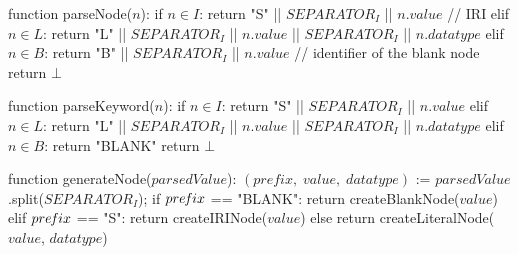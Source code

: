 function parseNode($n$):
    if $n \in I$:            
        return "S" || $SEPARATOR_{I}$ || $n.value$  // IRI
    elif $n \in L$:
        return "L" || $SEPARATOR_{I}$ || $n.value$ || $SEPARATOR_{I}$ || $n.datatype$
    elif $n \in B$:
        return "B" || $SEPARATOR_{I}$ || $n.value$    // identifier of the blank node
    return $\bot$

function parseKeyword($n$):
    if $n \in I$:            
        return "S" || $SEPARATOR_{I}$ || $n.value$   
    elif $n \in L$:
        return "L" || $SEPARATOR_{I}$ || $n.value$ || $SEPARATOR_{I}$ || $n.datatype$
    elif $n \in B$:
        return "BLANK"
    return $\bot$

function generateNode($parsedValue$):
    $(prefix, \; value, \; datatype)$ := $parsedValue$.split($SEPARATOR_{I}$);
    if $pre\textrm{\emph{f}}ix$ == "BLANK":
        return createBlankNode($value$)
    elif $pre\textrm{\emph{f}}ix$ == "S":
        return createIRINode($value$)
    else
        return createLiteralNode($value$, $datatype$)
    
